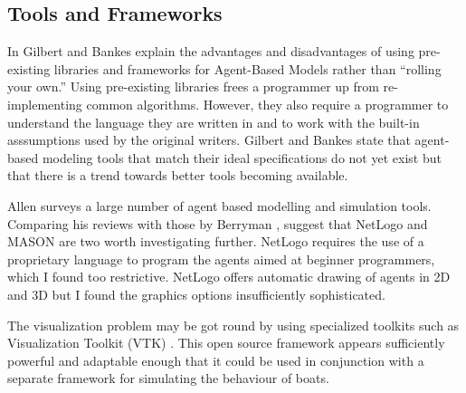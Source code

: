 \subsection{Tools and Frameworks}
In \cite{Gilbert2002} Gilbert and Bankes explain the advantages and
disadvantages of using pre-existing libraries and frameworks for Agent-Based Models rather
than ``rolling your own.'' Using pre-existing libraries frees a
programmer up from re-implementing common
algorithms. However, they also require a programmer to understand the
language they are written in and to work with the built-in
asssumptions used by the original writers. Gilbert and Bankes state
that agent-based modeling tools that match their ideal specifications
do not yet exist but that there is a trend towards better
tools becoming available.

Allen \cite{Allan2009} surveys a large number of agent based
modelling and simulation tools. Comparing his reviews with those by
Berryman \cite{Berryman2008}, suggest that NetLogo and MASON are two
worth investigating further. NetLogo requires the use of a proprietary
language to program the agents aimed at beginner programmers, which I
found too restrictive. NetLogo offers automatic drawing of agents in
2D and 3D but I found the graphics options insufficiently
sophisticated.

The visualization problem may be got round by using specialized
toolkits such as Visualization Toolkit (VTK) \cite{kitware}. This open source framework
appears sufficiently powerful and adaptable enough that it could be
used in conjunction with a separate framework for simulating the
behaviour of boats.
